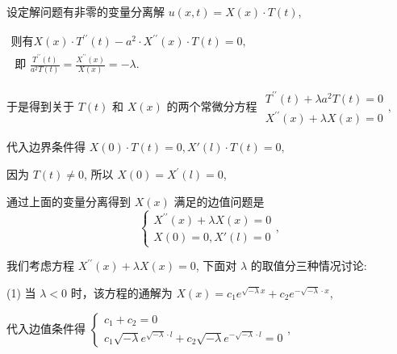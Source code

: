 \begin{questions}
 

\begin{solution}
设定解问题有非零的变量分离解 $ u(x, t)=X(x) \cdot T(t) $,

$
\begin{array}{l}
\text {则有} X(x) \cdot T^{\prime \prime}(t)-a^{2} \cdot X^{\prime \prime}(x) \cdot T(t)=0 ,  \\
\text { 即 } \frac{T^{\prime \prime}(t)}{a^{2} T(t)}=\frac{X^{\prime \prime}(x)}{X(x)}=-\lambda.
\end{array}
$

于是得到关于 $ T(t) $ 和 $ X(x) $ 的两个常微分方程
$
\begin{array}{l}
T^{\prime \prime}(t)+\lambda a^{2} T(t)=0 \\
X^{\prime \prime}(x)+\lambda X(x)=0
\end{array},
$

代入边界条件得 $ X(0) \cdot T(t)=0,X'(l) \cdot T(t)=0 , $

因为 $ T(t) \neq 0 $, 所以 $ X(0)=X^{\prime}(l)=0 $,

通过上面的变量分离得到 $ X(x) $ 满足的边值问题是
$$
\left\{\begin{array}{l}
X^{\prime \prime}(x)+\lambda X(x)=0 \\
X(0)=0, X'(l)=0 
\end{array}\right. ,
$$

我们考虑方程 $ X^{\prime \prime}(x)+\lambda X(x)=0 $, 下面对 $ \lambda $ 的取值分三种情况讨论:

(1) 当 $ \lambda<0 $ 时，该方程的通解为
$
X(x)=c_{1} e^{\sqrt{-\lambda} x}+c_{2} e^{-\sqrt{-\lambda} \cdot x}
$,

代入边值条件得 $ \left\{\begin{array}{l}c_{1}+c_{2}=0 \\ c_{1}\sqrt{-\lambda} e^{\sqrt{-\lambda } \cdot l}+c_{2}\sqrt{-\lambda} e^{-\sqrt{-\lambda} \cdot l}=0\end{array}\right. $,


\end{solution}
\end{questions}
